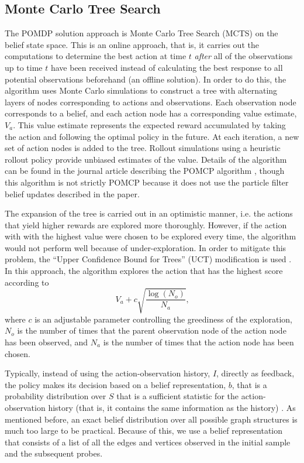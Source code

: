 \documentclass{IEEEtran}
\begin{document}
\subsection{Monte Carlo Tree Search}

The POMDP solution approach is Monte Carlo Tree Search (MCTS) \cite{Browne2012} on the belief state space. This is an online approach, that is, it carries out the computations to determine the best action at time $t$ \emph{after} all of the observations up to time $t$ have been received instead of calculating the best response to all potential observations beforehand (an offline solution). In order to do this, the algorithm uses Monte Carlo simulations to construct a tree with alternating layers of nodes corresponding to actions and observations. Each observation node corresponds to a belief, and each action node has a corresponding value estimate, $V_a$. This value estimate represents the expected reward accumulated by taking the action and following the optimal policy in the future. At each iteration, a new set of action nodes is added to the tree. Rollout simulations using a heuristic rollout policy provide unbiased estimates of the value. Details of the algorithm can be found in the journal article describing the POMCP algorithm \cite{Silver2010}, though this algorithm is not strictly POMCP because it does not use the particle filter belief updates described in the paper.

The expansion of the tree is carried out in an optimistic manner, i.e. the actions that yield higher rewards are explored more thoroughly. However, if the action with with the highest value were chosen to be explored every time, the algorithm would not perform well because of under-exploration. In order to mitigate this problem, the ``Upper Confidence Bound for Trees'' (UCT) modification is used \cite{Browne2012}. In this approach, the algorithm explores the action that has the highest score according to
\begin{equation}
    V_a + c \sqrt{\frac{\log{(N_o)}}{N_a}} \text{,}
\end{equation}
where $c$ is an adjustable parameter controlling the greediness of the exploration, $N_o$ is the number of times that the parent observation node of the action node has been observed, and $N_a$ is the number of times that the action node has been chosen.

Typically, instead of using the action-observation history, $I$, directly as feedback, the policy makes its decision based on a belief representation, $b$, that is a probability distribution over $S$ that is a sufficient statistic for the action-observation history (that is, it contains the same information as the history) \cite{Kochenderfer2015}. As mentioned before, an exact belief distribution over all possible graph structures is much too large to be practical. Because of this, we use a belief representation that consists of a list of all the edges and vertices observed in the initial sample and the subsequent probes.
\end{document}
